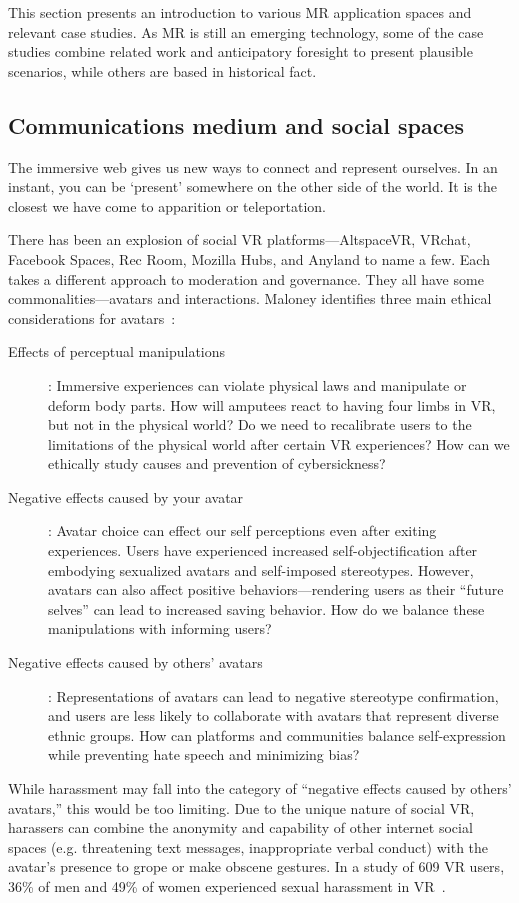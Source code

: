 This section presents an introduction to various MR application spaces and relevant case studies. As MR is still an emerging technology, some of the case studies combine related work and anticipatory foresight to present plausible scenarios, while others are based in historical fact.

\subsection{Communications medium and social spaces} \label{subsec:communications}
The immersive web gives us new ways to connect and represent ourselves. In an instant, you can be `present' somewhere on the other side of the world. It is the closest we have come to apparition or teleportation.

There has been an explosion of social VR platforms---AltspaceVR, VRchat, Facebook Spaces, Rec Room, Mozilla Hubs, and Anyland to name a few. Each takes a different approach to moderation and governance. They all have some commonalities---avatars and interactions. Maloney identifies three main ethical considerations for avatars~\cite{maloney}:
\begin{description}
	\item[ Effects of perceptual manipulations]: Immersive experiences can violate physical laws and manipulate or deform body parts. How will amputees react to having four limbs in VR, but not in the physical world? Do we need to recalibrate users to the limitations of the physical world after certain VR experiences? How can we ethically study causes and prevention of cybersickness?
	\item [Negative effects caused by your avatar]: Avatar choice can effect our self perceptions even after exiting experiences. Users have experienced increased self-objectification after embodying sexualized avatars and self-imposed stereotypes. However, avatars can also affect positive behaviors---rendering users as their ``future selves'' can lead to increased saving behavior. How do we balance these manipulations with informing users?
	\item [Negative effects caused by others' avatars]: Representations of avatars can lead to negative stereotype confirmation, and users are less likely to collaborate with avatars that represent diverse ethnic groups. How can platforms and communities balance self-expression while preventing hate speech and minimizing bias?
\end{description}

While harassment may fall into the category of ``negative effects caused by others' avatars,'' this would be too limiting. Due to the unique nature of social VR, harassers can combine the anonymity and capability of other internet social spaces (e.g. threatening text messages, inappropriate verbal conduct) with the avatar's presence to grope or make obscene gestures. In a study of 609 VR users, 36\% of men and 49\% of women experienced sexual harassment in VR~\cite{outlaw2018}.

